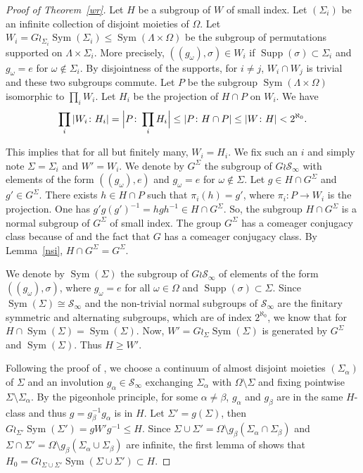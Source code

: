 \documentclass[JEP,XML,SOM,Unicode,NoFloatCountersInSection]{cedram}
\let\mathcal\mathscr
\theoremstyle{plain}
\theoremstyle{definition}
\newcommand{\cS}{\mathcal{S}}
\newcommand{\sinf}{\cS_\infty}
\DeclareMathOperator{\supp}{Supp}
\DeclareMathOperator{\Sym}{Sym}
\begin{document}
\begin{proof}[Proof of Theorem~\ref{wr}] Let $H$ be a subgroup of $W$ of small index. Let $(\Sigma_i)$ be an infinite collection of disjoint moieties of $\Omega$. Let $W_i=G\wr_{\Sigma_i} \Sym(\Sigma_i)\leq\Sym(\Lambda\times \Omega)$ be the subgroup of permutations supported on $\Lambda\times\Sigma_i$. More precisely, $\left((g_\omega),\sigma\right)\in W_i$ if $\supp(\sigma)\subset \Sigma_i$ and $g_\omega=e$ for $\omega\notin \Sigma_i$. By disjointness of the supports, for $i\neq j$, $W_i\cap W_j$ is trivial and these two subgroups commute. Let $P$ be the subgroup $\Sym(\Lambda\times \Omega)$ isomorphic to $\prod_i W_i$. Let $H_i$ be the projection of $H\cap P$ on $W_i$. We have
\[
\prod_{i}|W_i\colon H_i|=\Bigl|P\colon \prod_{i}H_i\Bigr|\leq|P\colon H\cap P|\leq|W\colon H|<2^{\aleph_0}.
\]

This implies that for all but finitely many, $W_i=H_i$. We fix such an $i$ and simply note $\Sigma=\Sigma_i$ and $W'=W_i$. We denote by $G^\Sigma$ the subgroup of $G\wr\sinf$ with elements of the form $((g_\omega),e)$ and $g_\omega=e$ for $\omega\notin \Sigma$. Let $g\in H\cap G^\Sigma$ and $g'\in G^\Sigma$. There exists $h\in H\cap P$ such that $\pi_i(h)=g'$, where $\pi_i\colon P\to W_i$ is the projection. One has $g'g(g')^{-1}= hgh^{-1}\in H\cap G^\Sigma$. So, the subgroup $H\cap G^\Sigma$ is a normal subgroup of $G^\Sigma$ of small index. The group $G^\Sigma$ has a comeager conjugacy class because of \cite[Lem.\,11]{Rosendal-Solecki} and the fact that $G$ has a comeager conjugacy class. By Lemma~\ref{nsi}, $H\cap G^\Sigma=G^\Sigma$.

We denote by $\Sym(\Sigma)$ the subgroup of $G\wr\sinf$ of elements of the form $((g_\omega),\sigma)$, where $g_\omega=e$ for all $\omega\in\Omega$ and $\supp(\sigma)\subset \Sigma$. Since $\Sym(\Sigma)\cong\sinf$ and the non-trivial normal subgroups of $\sinf$ are the finitary symmetric and alternating subgroups, which are of index $2^{\aleph_0}$, we know that for $H\cap \Sym(\Sigma)=\Sym(\Sigma)$. Now, $W'=G\wr_\Sigma\Sym(\Sigma)$ is generated by $G^\Sigma$ and $\Sym(\Sigma)$. Thus $H\geq W'$.

Following the proof of \cite[Th.\,1]{MR859950}, we choose a continuum of almost disjoint moieties $(\Sigma_\alpha)$ of $\Sigma$ and an involution $g_\alpha\in\sinf$ exchanging $\Sigma_\alpha$ with $\Omega\setminus\Sigma$ and fixing pointwise $\Sigma\setminus\Sigma_\alpha$. By the pigeonhole principle, for some $\alpha\neq\beta$, $g_\alpha$ and $g_\beta$ are in the same $H$-class and thus $g=g_\beta^{-1} g_\alpha$ is in $H$. Let $\Sigma'=g(\Sigma)$, then $G\wr_{\Sigma'}\Sym(\Sigma')=gW'g^{-1}\leq H$. Since $\Sigma\cup\Sigma'=\Omega\setminus g_\beta(\Sigma_\alpha\cap\Sigma_\beta)$ and $\Sigma\cap\Sigma'=\Omega\setminus g_\beta(\Sigma_\alpha\cup\Sigma_\beta)$ are infinite, the first lemma of \cite{MR859950} shows that $H_0=G\wr_{\Sigma\cup\Sigma'}\Sym(\Sigma\cup\Sigma')\subset H$.


\end{proof}
\end{document}
